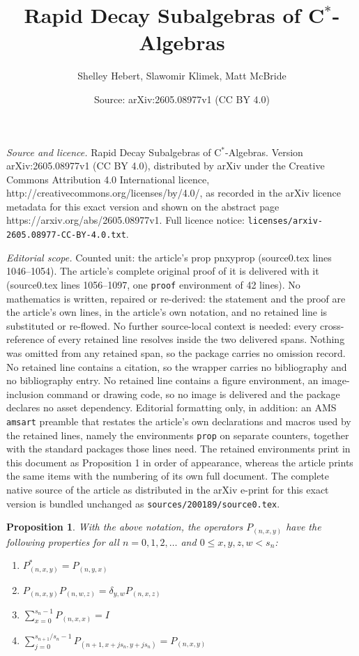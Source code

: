 \documentclass[10pt,a4paper]{amsart}
\title{Rapid Decay Subalgebras of C$^*$-Algebras}
\author{Shelley Hebert, Slawomir Klimek, Matt McBride}
\date{Source: arXiv:2605.08977v1 (CC BY 4.0)}
\newtheorem{prop}{Proposition}
\begin{document}
\maketitle

\noindent\emph{Source and licence.} Rapid Decay Subalgebras of C$^*$-Algebras. Version arXiv:2605.08977v1 (CC BY 4.0), distributed by arXiv under the Creative Commons Attribution 4.0 International licence, http://creativecommons.org/licenses/by/4.0/, as recorded in the arXiv licence metadata for this exact version and shown on the abstract page https://arxiv.org/abs/2605.08977v1. Full licence notice: \texttt{licenses/arxiv-2605.08977-CC-BY-4.0.txt}.\par\smallskip

\noindent\textit{Editorial scope.} Counted unit: the article's prop pnxyprop (source0.tex lines 1046--1054). The article's complete original proof of it is delivered with it (source0.tex lines 1056--1097, one \texttt{proof} environment of 42 lines). No mathematics is written, repaired or re-derived: the statement and the proof are the article's own lines, in the article's own notation, and no retained line is substituted or re-flowed.  No further source-local context is needed: every cross-reference of every retained line resolves inside the two delivered spans.  Nothing was omitted from any retained span, so the package carries no omission record.  No retained line contains a citation, so the wrapper carries no bibliography and no bibliography entry.  No retained line contains a figure environment, an image-inclusion command or drawing code, so no image is delivered and the package declares no asset dependency.  Editorial formatting only, in addition: an AMS \texttt{amsart} preamble that restates the article's own declarations and macros used by the retained lines, namely the environments \texttt{prop} on separate counters, together with the standard packages those lines need.  The retained environments print in this document as Proposition 1 in order of appearance, whereas the article prints the same items with the numbering of its own full document.  The complete native source of the article as distributed in the arXiv e-print for this exact version is bundled unchanged as \texttt{sources/200189/source0.tex}.
\begin{prop}\label{pnxyprop}
With the above notation, the operators $P_{(n,x,y)}$ have the following properties for all  $n=0,1,2, \ldots$ and $0\leq x,y,z,w<s_n$:
\begin{enumerate}
\item $P_{(n,x,y)}^*=P_{(n,y,x)}$
\item  $P_{(n,x,y)}P_{(n,w,z)}=\delta_{y,w}P_{(n,x,z)}$
\item  $\sum\limits_{x=0}^{s_n-1}P_{(n,x,x)}=I$
\item   $\sum\limits_{j=0}^{s_{n+1}/s_n-1}P_{(n+1,x+js_n,y+js_n)}=P_{(n,x,y)}$
\end{enumerate}
\end{prop}
\end{document}

